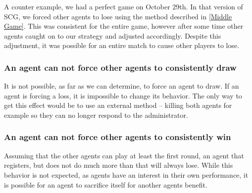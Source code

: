 \documentclass[letterpaper,12pt,oneside]{article}
\begin{document}
A counter example, we had a perfect game on October 29th. In that version
of SCG, we forced other agents to lose using the method described in
\ref{Middle Game}. This was consistent for the entire game, however after some
time other agents caught on to our strategy and adjusted accordingly. Despite
this adjustment, it was possible for an entire match to cause other players to
lose.

\subsubsection{An agent can not force other agents to consistently draw}

It is not possible, as far as we can determine, to force an agent to draw. If
an agent is forcing a loss, it is impossible to change its behavior. The only
way to get this effect would be to use an external method -- killing both
agents for example so they can no longer respond to the administrator.

\subsubsection{An agent can not force other agents to consistently win}

Assuming that the other agents can play at least the first round, an agent
that registers, but does not do much more than that will always lose. While
this behavior is not expected, as agents have an interest in their own
performance, it is possible for an agent to sacrifice itself for another
agents benefit.


% 
%
{}

\end{document}
